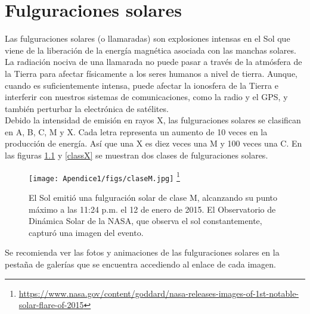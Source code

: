 \chapter{Fulguraciones solares}

Las fulguraciones solares (o llamaradas) son explosiones intensas en el Sol que viene de la liberación de la energía magnética asociada con las manchas solares. La radiación nociva de una llamarada no puede pasar a través de la atmósfera de la Tierra para afectar físicamente a los seres humanos a nivel de tierra. Aunque, cuando es suficientemente intensa,  puede afectar la ionosfera de la Tierra e interferir con nuestros sistemas de comunicaciones, como la radio y el GPS, y también perturbar la electrónica de satélites.\\


Debido la intensidad de emisión en rayos X, las fulguraciones solares se clasifican en A, B, C, M y X. Cada letra representa un aumento de 10 veces en la producción de energía\cite{nasa}. Así que una X es diez veces una M y 100 veces una C. En las figuras \ref{classM} y \ref{classX} se muestran dos clases de fulguraciones solares.\\

\begin{figure}[H]
\begin{minipage}{0.6\textwidth}
\begin{center}
\texttt{[image: Apendice1/figs/claseM.jpg]}
\footnote{\url{https://www.nasa.gov/content/goddard/nasa-releases-images-of-1st-notable-solar-flare-of-2015}} 
\end{center}
\end{minipage}
\hspace{0.1cm}
\begin{minipage}{0.4\textwidth}
\caption[Fulguración solar de clase M, 12 de enero de 2015]{El Sol emitió una fulguración solar de clase M, alcanzando su punto máximo a las 11:24 p.m. el 12 de enero de 2015. El Observatorio de Dinámica Solar de la NASA, que observa el sol constantemente, capturó una imagen del evento.}
\label{classM}
\end{minipage}
\end{figure}

Se recomienda ver las fotos y animaciones de las fulguraciones solares en la pestaña de galerías que se encuentra accediendo al enlace de cada imagen.

